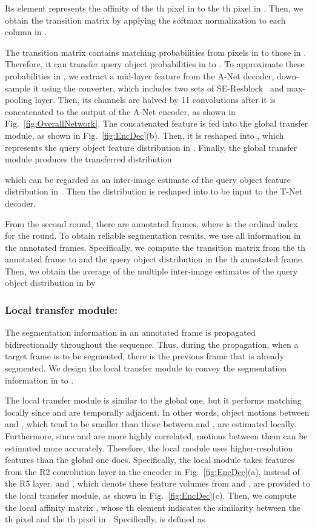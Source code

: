 \documentclass[runningheads]{llncs}
\begin{document}
Its element  represents the affinity of the th pixel in  to the th pixel in . Then, we obtain the transition matrix  by applying the softmax normalization to each column in .

The transition matrix  contains matching probabilities from pixels in  to those in . Therefore, it can transfer query object probabilities in  to . To approximate these probabilities in , we extract a mid-layer feature from the A-Net decoder, down-sample it using the converter, which includes two sets of SE-Resblock~\cite{hu2018squeeze} and max-pooling layer. Then, its channels are halved by 11 convolutions after it is concatenated to the output of the A-Net encoder, as shown in Fig.~\ref{fig:OverallNetwork}. The concatenated feature  is fed into the global transfer module, as shown in Fig.~\ref{fig:EncDec}(b). Then, it is reshaped into , which represents the query object feature distribution in . Finally, the global transfer module produces the transferred distribution

which can be regarded as an inter-image estimate of the query object feature distribution in . Then the distribution is reshaped into  to be input to the T-Net decoder.

From the second round, there are  annotated frames, where  is the ordinal index for the round. To obtain reliable segmentation results, we use all information in the  annotated frames. Specifically, we compute the transition matrix  from the th annotated frame to  and the query object distribution  in the th annotated frame. Then, we obtain the average of the multiple inter-image estimates of the query object distribution in  by


\subsubsection{Local transfer module:} \label{subsubsec:RFCmodule}
The segmentation information in an annotated frame is propagated bidirectionally throughout the sequence. Thus, during the propagation, when a target frame  is to be segmented, there is the previous frame  that is already segmented. We design the local transfer module to convey the segmentation information in  to .

The local transfer module is similar to the global one, but it performs matching locally since  and  are temporally adjacent. In other words, object motions between  and , which tend to be smaller than those between  and , are estimated locally. Furthermore, since  and  are more highly correlated, motions between them can be estimated more accurately. Therefore, the local module uses higher-resolution features than the global one does. Specifically, the local module takes features from the R2 convolution layer in the encoder in Fig.~\ref{fig:EncDec}(a), instead of the R5 layer.  and , which denote these feature volumes from  and , are provided to the local transfer module, as shown in Fig.~\ref{fig:EncDec}(c). Then, we compute the local affinity matrix , whose th element indicates the similarity between the th pixel  and the th pixel in . Specifically,  is defined as
 
\end{document}
